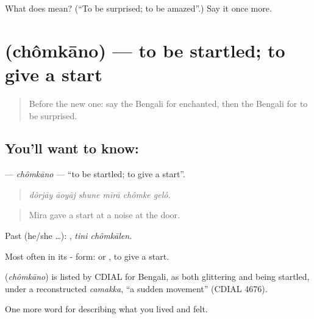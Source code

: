 \begin{tcolorbox}[breakable,colback=teal!4,colframe=teal!35!black,title={Before you move on}]
What does   mean? (\textquotedblleft{}To be surprised; to be amazed\textquotedblright{}.) Say it once more.
\end{tcolorbox}
\section[\texorpdfstring{\bn{চমকানো} (chômkāno)}{চমকানো (chômkāno)}]{ (chômkāno) — to be startled; to give a start}

\label{lesson:BN-C440-chomkano}



\begin{quote}
Before the new one: say the Bengali for enchanted, then the Bengali for to be surprised.
\end{quote}

\subsection*{You'll want to know: }
\textbf{} — \emph{chômkāno} — \textquotedblleft{}to be startled; to give a start\textquotedblright{}.

\begin{quote}
     
\end{quote}

\begin{quote}
\emph{dôrjāy āoyāj shune mīrā chômke gelô.}
\end{quote}

\begin{quote}
Mira gave a start at a noise at the door.
\end{quote}

Past (he/she …):  , \emph{tini chômkālen}.

Most often in its - form:   or  , to give a start.

\begin{cousinweb}
\textbf{} (\emph{chômkāno}) is listed by CDIAL for Bengali, as both glittering and being startled, under a reconstructed \emph{camakka}, \textquotedblleft{}a sudden movement\textquotedblright{} (CDIAL 4676).
\end{cousinweb}

\begin{grammarlens}[title={What you've built}]
One more word for describing what you lived and felt.
\end{grammarlens}

